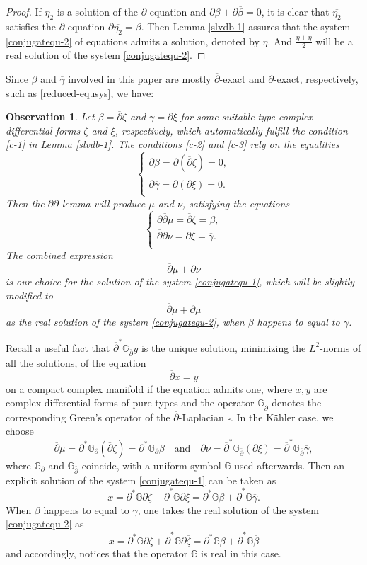 \documentclass[12pt]{amsart}
\numberwithin{equation}{section}
\newtheorem{observation}  [theorem]     {Observation}
\renewcommand{\1}{\mathds{1}}
\newcommand{\G}{\mathbb{G}}
\newcommand{\db}{\overline{\partial}}
\newcommand{\bproof}{\begin{proof}}
\newcommand{\eproof}{\end{proof}}
\newcommand{\beq}{\begin{equation}}
\newcommand{\eeq}{\end{equation}}
\renewcommand{\>}{\rightarrow}
\newcommand{\p}{\partial}
\def\p{\partial}
\begin{document}
\bproof If $\eta_2$ is a solution of the $\db$-equation and $\db
\beta + \p \overline{\beta} = 0$, it is clear that
$\overline{\eta_2}$ satisfies the $\p$-equation $\p
\overline{\eta_2} = \beta$. Then Lemma \ref{slvdb-1} assures that
the system \eqref{conjugatequ-2} of equations admits a solution,
denoted by $\eta$. And $\frac{\eta + \overline{\eta}}{2}$ will be a
real solution of the system \eqref{conjugatequ-2}. \eproof

Since
$\beta$ and $\overline{\gamma}$ involved in this paper are mostly
$\db$-exact and $\p$-exact, respectively, such as \eqref{reduced-equsys}, we have:
\begin{observation}\label{expslt}
\emph{Let $\beta=\db \zeta$ and
$\overline{\gamma} = \p \xi$ for some suitable-type complex
differential forms $\zeta$ and $\xi$, respectively, which automatically fulfill the
condition \eqref{c-1} in Lemma \ref{slvdb-1}. The conditions
\eqref{c-2} and \eqref{c-3} rely on the equalities
\begin{equation}\label{db-condition}
\left\{
\begin{aligned}
\p \beta = \p (\db \zeta) =0, \\
\db \overline{\gamma} = \db (\p \xi)=0. \\
\end{aligned} \right.
\end{equation}
Then the $\p\db$-lemma will produce $\mu$ and $\nu$, satisfying the
equations \beq\label{mslmm} \left\{ \begin{aligned}
\p \db \mu = \db \zeta =\beta, \\
\db \p \nu = \p \xi = \overline{\gamma}. \\
\end{aligned} \right.  \eeq
The combined expression \beq\label{cbslt} \db \mu + \p \nu \eeq is
our choice for the solution of the system \eqref{conjugatequ-1}, which will be slightly modified to
\[\db \mu + \p \bar \mu\]
as the real solution of the system \eqref{conjugatequ-2}, when
$\beta$ happens to equal to $\gamma$.}
\end{observation}

Recall a useful fact that $\db^*\G_{\db}y$ is the unique
solution, minimizing the $L^2$-norms of all the solutions, of the
equation
\[ \db x=y \]
on a compact complex manifold if the equation admits one, where
$x,y$ are complex differential forms of pure types and the operator
$\G_{\db}$ denotes the corresponding Green's operator of the
$\db$-Laplacian $\square$. In the K\"ahler case, we choose \[ \db
\mu = \p^* \G_{\p} (\db \zeta)=\p^* \G_{\p} \beta
\quad\text{and}\quad \p \nu = \db^* \G_{\db} (\p \xi) =  \db^*
\G_{\db} \overline{\gamma},\] where $\G_{\p}$ and $\G_{\db}$
coincide, with a uniform symbol $\G$ used afterwards. Then an
explicit solution of the system \eqref{conjugatequ-1} can be taken
as
\[ x = \p^* \G \db \zeta + \db^* \G \p \xi
=\p^* \G \beta + \db^* \G \overline{\gamma}. \] When $\beta$ happens
to equal to $\gamma$, one takes the real solution of the system
\eqref{conjugatequ-2} as
\beq\label{ees} x = \p^* \G
\db \zeta + \db^* \G \p \overline{\zeta} =\p^* \G \beta + \db^* \G
\overline{\beta} \eeq
and accordingly, notices that the operator $\G$
is real in this case.
\end{document}
